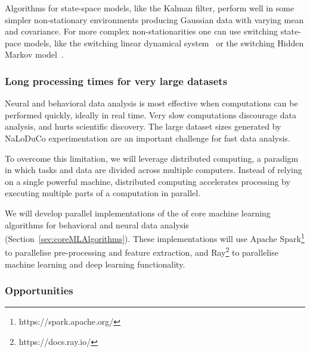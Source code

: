 \documentclass[12pt]{article}
\begin{document}
Algorithms for state-space models, like the Kalman filter, perform well in some
simpler non-stationary environments producing Gaussian data with varying mean and
covariance.
%
For more complex non-stationarities one can use switching state-pace models,
like the switching linear dynamical system~\cite{} or the switching Hidden
Markov model~\cite{}.

\subsubsection*{Long processing times for very large datasets}

Neural and behavioral data analysis is most effective when computations can be
performed quickly, ideally in real time. Very slow computations discourage data
analysis, and hurts scientific discovery. The large dataset sizes generated by
NaLoDuCo experimentation are an important challenge for fast data analysis.

To overcome this limitation, we will leverage distributed computing, a paradigm
in which tasks and data are divided across multiple computers. Instead of
relying on a single powerful machine, distributed computing accelerates
processing by executing multiple parts of a computation in parallel.

We will develop parallel implementations of the of core machine learning
algorithms for behavioral and neural data analysis (Section~\ref{sec:coreMLAlgorithms}).
These implementations will use Apache Spark\footnote{https://spark.apache.org/}
to parallelise pre-processing and feature extraction, and
Ray\footnote{https://docs.ray.io/} to parallelise machine learning and deep
learning functionality.

\subsubsection{Opportunities}
\end{document}
